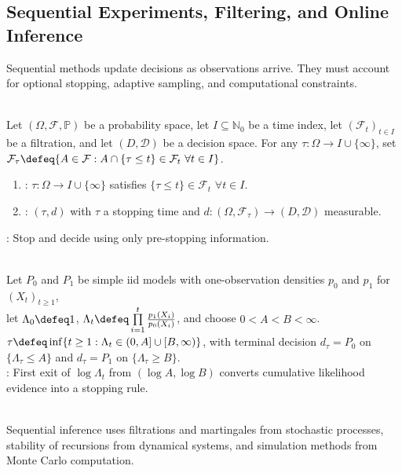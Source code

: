 \subsection{Sequential Experiments, Filtering, and Online Inference}

Sequential methods update decisions as observations arrive.  They must account for optional stopping, adaptive sampling, and computational constraints.

\begin{definition} \label{def:sequential-test-stopping-time} \\
Let $(\Omega,\mathcal{F},\mathbb{P})$ be a probability space, let $I\subseteq\mathbb{N}_0$ be a time index, let $(\mathcal{F}_t)_{t\in I}$ be a filtration, and let $(D,\mathcal{D})$ be a decision space.
For any $\tau:\Omega\to I\cup\{\infty\}$, set $\mathcal{F}_\tau\defeq\{A\in\mathcal{F}:A\cap\{\tau\leq t\}\in\mathcal{F}_t\ \forall t\in I\}$.
\begin{enumerate}[label=(\roman*)]
\setlength{\itemsep}{0pt}
\item {}: $\tau:\Omega\to I\cup\{\infty\}$ satisfies $\{\tau\leq t\}\in\mathcal{F}_t$ $\forall t\in I$.
\item {}: $(\tau,d)$ with $\tau$ a stopping time and $d:(\Omega,\mathcal{F}_\tau)\to(D,\mathcal{D})$ measurable.
\end{enumerate}
: Stop and decide using only pre-stopping information.
\end{definition}

\begin{definition} \label{def:sprt} \\
Let $P_0$ and $P_1$ be simple iid models with one-observation densities $p_0$ and $p_1$ for $(X_t)_{t\geq1}$,\\
let $\Lambda_0\defeq1$, $\Lambda_t\defeq\prod\limits_{i=1}^{t}\frac{p_1(X_i)}{p_0(X_i)}$, and choose $0<A<B<\infty$.\\
$\tau\defeq\inf\{t\geq1:\Lambda_t\in(0,A]\cup[B,\infty)\}$, with terminal decision $d_\tau=P_0$ on $\{\Lambda_\tau\leq A\}$ and $d_\tau=P_1$ on $\{\Lambda_\tau\geq B\}$.\\
: First exit of $\log\Lambda_t$ from $(\log A,\log B)$ converts cumulative likelihood evidence into a stopping rule.
\end{definition}

\begin{remark} \label{rem:sequential-cross-references} \\
Sequential inference uses filtrations and martingales from stochastic processes, stability of recursions from dynamical systems, and simulation methods from Monte Carlo computation.
\end{remark}
